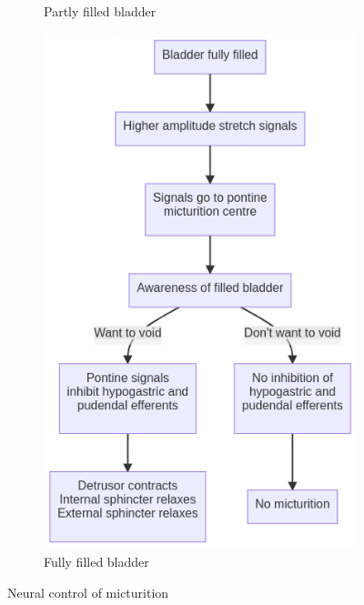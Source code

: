 \documentclass[
  12pt,
]{memoir}
\begin{document}
\begin{figure}
\begin{subfigure}{.4\textwidth}
        \vspace{6mm}
        \caption{Partly filled bladder}
    \end{subfigure}\hfill
    \begin{subfigure}{.55\textwidth}
        \includegraphics[width=\textwidth]{../assets/med/mic-filled.png}
        \vspace{6mm}
        \caption{Fully filled bladder}
    \end{subfigure}
    \vspace{10mm}
    \caption{Neural control of micturition}

\end{figure}
\end{document}
